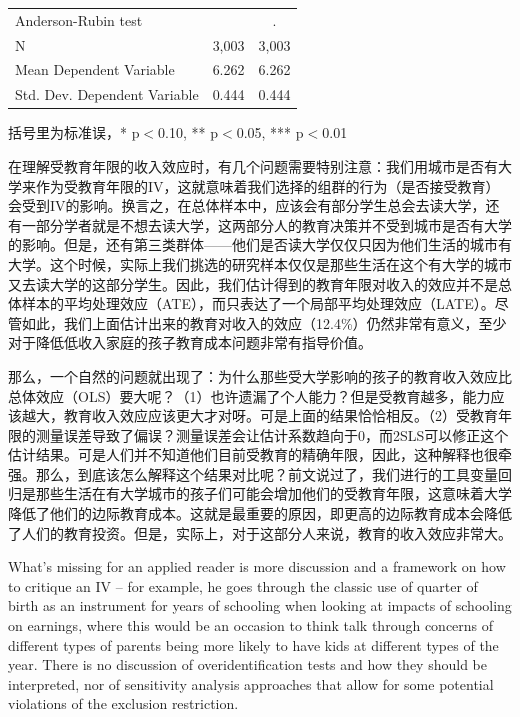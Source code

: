 \documentclass[cn,12pt,math=newtx,citestyle=gb7714-2015,bibstyle=gb7714-2015]{elegantbook}
\begin{document}
\begin{table}[htbp]
\begin{center}
\begin{threeparttable}
\begin{tabular}{l*{2}{c}}
					Anderson-Rubin test &               &           .   \\
					N                   &       3,003   &       3,003   \\
					Mean Dependent Variable&       6.262   &       6.262   \\
					Std. Dev. Dependent Variable&       0.444   &       0.444   \\
					\bottomrule
				\end{tabular}
				\begin{tablenotes}
					\tiny
					\item 括号里为标准误，* p$<$0.10, ** p$<$0.05, *** p$<$0.01
				\end{tablenotes}
			\end{threeparttable}
		\end{center}
	\end{table}
	
	在理解受教育年限的收入效应时，有几个问题需要特别注意：我们用城市是否有大学来作为受教育年限的IV，这就意味着我们选择的组群的行为（是否接受教育）会受到IV的影响。换言之，在总体样本中，应该会有部分学生总会去读大学，还有一部分学者就是不想去读大学，这两部分人的教育决策并不受到城市是否有大学的影响。但是，还有第三类群体——他们是否读大学仅仅只因为他们生活的城市有大学。这个时候，实际上我们挑选的研究样本仅仅是那些生活在这个有大学的城市又去读大学的这部分学生。因此，我们估计得到的教育年限对收入的效应并不是总体样本的平均处理效应（ATE），而只表达了一个局部平均处理效应（LATE）。尽管如此，我们上面估计出来的教育对收入的效应（12.4\%）仍然非常有意义，至少对于降低低收入家庭的孩子教育成本问题非常有指导价值。
	
	那么，一个自然的问题就出现了：为什么那些受大学影响的孩子的教育收入效应比总体效应（OLS）要大呢？（1）也许遗漏了个人能力？但是受教育越多，能力应该越大，教育收入效应应该更大才对呀。可是上面的结果恰恰相反。（2）受教育年限的测量误差导致了偏误？测量误差会让估计系数趋向于0，而2SLS可以修正这个估计结果。可是人们并不知道他们目前受教育的精确年限，因此，这种解释也很牵强。那么，到底该怎么解释这个结果对比呢？前文说过了，我们进行的工具变量回归是那些生活在有大学城市的孩子们可能会增加他们的受教育年限，这意味着大学降低了他们的边际教育成本。这就是最重要的原因，即更高的边际教育成本会降低了人们的教育投资。但是，实际上，对于这部分人来说，教育的收入效应非常大。
	
	What’s missing for an applied reader is more discussion and a framework on how to critique an IV – for example, he goes through the classic use of quarter of birth as an instrument for years of schooling when looking at impacts of schooling on earnings, where this would be an occasion to think talk through concerns of different types of parents being more likely to have kids at different types of the year. There is no discussion of overidentification tests and how they should be interpreted, nor of sensitivity analysis approaches that allow for some potential violations of the exclusion restriction.
	
\end{document}
